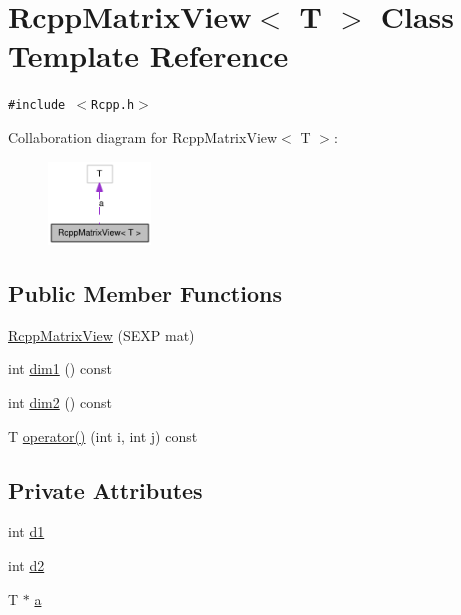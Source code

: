 \hypertarget{classRcppMatrixView}{
\section{RcppMatrixView$<$ T $>$ Class Template Reference}
\label{classRcppMatrixView}
}
{\tt \#include $<$Rcpp.h$>$}

Collaboration diagram for RcppMatrixView$<$ T $>$:\nopagebreak
\begin{figure}[H]
\begin{center}
\leavevmode
\includegraphics[width=77pt]{classRcppMatrixView__coll__graph}
\end{center}
\end{figure}
\subsection*{Public Member Functions}
\begin{CompactItemize}
\item 
\hyperlink{classRcppMatrixView_c3489c6a24c2975f3ea7103ada50e328}{RcppMatrixView} (SEXP mat)
\item 
int \hyperlink{classRcppMatrixView_72d1d7fcdc4b1cc6dd877b1df2f9f5e6}{dim1} () const 
\item 
int \hyperlink{classRcppMatrixView_ebb7f65646ce780c897dc39f31899439}{dim2} () const 
\item 
T \hyperlink{classRcppMatrixView_d135a7e855eee55b078807766aff9e96}{operator()} (int i, int j) const 
\end{CompactItemize}
\subsection*{Private Attributes}
\begin{CompactItemize}
\item 
int \hyperlink{classRcppMatrixView_d492401691ef709f6d2ef7dc1dcc2134}{d1}
\item 
int \hyperlink{classRcppMatrixView_37b5f5806957eeb0b688d6a157a2a264}{d2}
\item 
T $\ast$ \hyperlink{classRcppMatrixView_d38481118f63a84a132e8f2265de5bdd}{a}
\end{CompactItemize}


